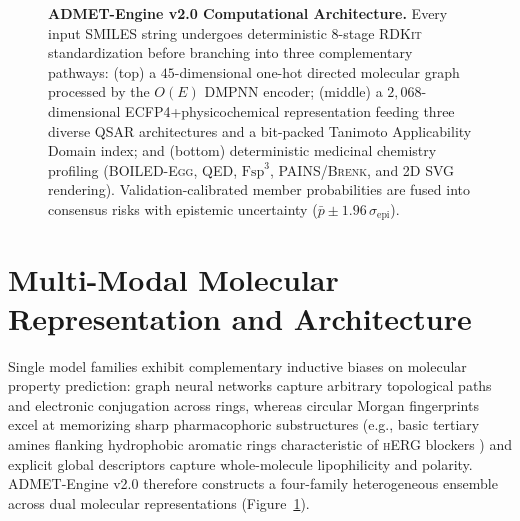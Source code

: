\documentclass[10pt,twocolumn,letterpaper]{article}
\newcommand{\sige}{\sigma_{\mathrm{epi}}}
\begin{document}
\begin{figure}[t]
  \caption{\textbf{ADMET-Engine v2.0 Computational Architecture.} Every input \textsc{SMILES} string undergoes deterministic 8-stage \textsc{RDKit} standardization before branching into three complementary pathways: (top) a $45$-dimensional one-hot directed molecular graph processed by the $O(E)$ \textsc{DMPNN} encoder; (middle) a $2{,}068$-dimensional \textsc{ECFP4}+physicochemical representation feeding three diverse \textsc{QSAR} architectures and a bit-packed Tanimoto Applicability Domain index; and (bottom) deterministic medicinal chemistry profiling (\textsc{BOILED-Egg}, \textsc{QED}, $\mathrm{Fsp}^3$, \textsc{PAINS}/\textsc{Brenk}, and 2D \textsc{SVG} rendering). Validation-calibrated member probabilities are fused into consensus risks with epistemic uncertainty ($\bar{p} \pm 1.96\,\sige$).}
  \label{fig:architecture}
\end{figure}

\section{Multi-Modal Molecular Representation and Architecture}
Single model families exhibit complementary inductive biases on molecular property prediction: graph neural networks capture arbitrary topological paths and electronic conjugation across rings, whereas circular Morgan fingerprints excel at memorizing sharp pharmacophoric substructures (e.g., basic tertiary amines flanking hydrophobic aromatic rings characteristic of \textsc{hERG} blockers \citep{sanguinetti2006herg}) and explicit global descriptors capture whole-molecule lipophilicity and polarity. ADMET-Engine v2.0 therefore constructs a four-family heterogeneous ensemble across dual molecular representations (Figure~\ref{fig:architecture}).
\end{document}
